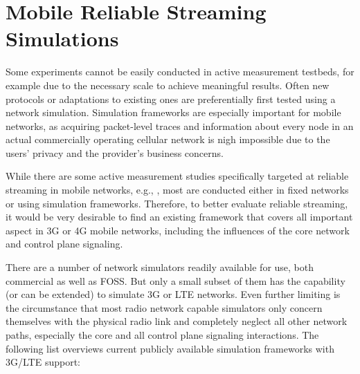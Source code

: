 \section{Mobile Reliable Streaming Simulations}
\label{c6:sec:mobilestreamingtestbed}

Some experiments cannot be easily conducted in active measurement testbeds, for example due to the necessary scale to achieve meaningful results. Often new protocols or adaptations to existing ones are preferentially first tested using a network simulation. Simulation frameworks are especially important for mobile networks, as acquiring packet-level traces and information about every node in an actual commercially operating cellular network is nigh impossible due to the users' privacy and the provider's business concerns.

While there are some active measurement studies specifically targeted at reliable streaming in mobile networks, e.g., \cite{Muller:2012:EDA:2151677.2151686}, most are conducted either in fixed networks or using simulation frameworks. Therefore, to better evaluate reliable streaming, it would be very desirable to find an existing framework that covers all important aspect in \gls{3G} or 4G mobile networks, including the influences of the core network and control plane signaling.

There are a number of network simulators readily available for use, both commercial as well as \gls{FOSS}. But only a small subset of them has the capability (or can be extended) to simulate \gls{3G} or \gls{LTE} networks. Even further limiting is the circumstance that most radio network capable simulators only concern themselves with the physical radio link and completely neglect all other network paths, especially the core and all control plane signaling interactions. The following list overviews current publicly available simulation frameworks with \gls{3G}/\gls{LTE} support:

